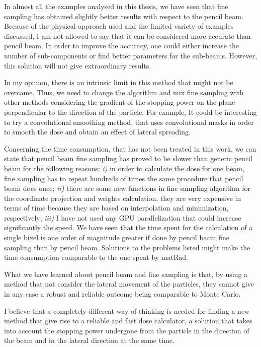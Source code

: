 \documentclass[12pt, a4paper, twoside]{book}
\begin{document}
In almost all the examples analysed in this thesis, we have seen that fine sampling has obtained slightly better results with respect to the pencil beam. Because of the physical approach used and the limited variety of examples discussed, I am not allowed to say that it can be considered more accurate than pencil beam. In order to improve the accuracy, one could either increase the number of sub-components or find better parameters for the sub-beams. However, this solution will not give extraordinary results.

In my opinion, there is an intrinsic limit in this method that might not be overcame. Thus, we need to change the algorithm and mix fine sampling with other methods considering the gradient of the stopping power on the plane perpendicular to the direction of the particle. For example, It could be interesting to try a convolutional smoothing method, that uses convolutional masks in order to smooth the dose and obtain an effect of lateral spreading.

Concerning the time consumption, that has not been treated in this work, we can state that pencil beam fine sampling has proved to be slower than generic pencil beam for the following reasons: \emph{i)} in order to calculate the dose for one beam, fine sampling has to repeat hundreds of times the same procedure that pencil beam does once; \emph{ii)} there are some new functions in fine sampling algorithm for the coordinate projection and weights calculation, they are very expensive in terms of time because they are based on interpolation and minimization, respectively; \emph{iii)} I have not used any GPU parallelization that could increase significantly the speed.
We have seen that the time spent for the calculation of a single bixel is one order of magnitude greater if done by pencil beam fine sampling than by pencil beam.
Solutions to the problems listed might make the time consumption comparable to the one spent by matRad.

What we have learned about pencil beam and fine sampling is that, by using a method that not consider the lateral movement of the particles, they cannot give in any case a robust and reliable outcome being comparable to Monte Carlo.

I believe that a completely different way of thinking is needed for finding a new method that give rise to a reliable and fast dose calculator, a solution that takes into account the stopping power undergone from the particle in the direction of the beam and in the lateral direction at the same time. 
\end{document}
